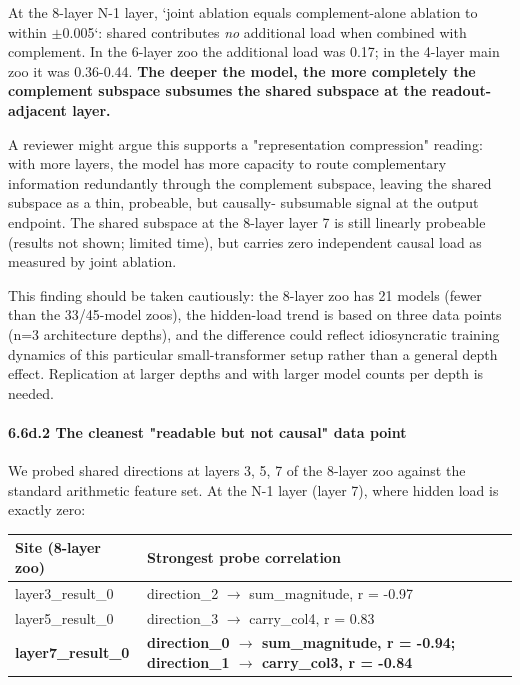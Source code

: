 At the 8-layer N-1 layer, `joint ablation equals complement-alone
ablation to within $\pm$0.005`: shared contributes \emph{no} additional load
when combined with complement. In the 6-layer zoo the additional load
was 0.17; in the 4-layer main zoo it was 0.36-0.44. \textbf{The deeper the model, the more completely the complement subspace subsumes the shared subspace at the readout-adjacent layer.}

A reviewer might argue this supports a "representation compression"
reading: with more layers, the model has more capacity to route
complementary information redundantly through the complement subspace,
leaving the shared subspace as a thin, probeable, but causally-
subsumable signal at the output endpoint. The shared subspace at the
8-layer layer 7 is still linearly probeable (results not shown; limited
time), but carries zero independent causal load as measured by joint
ablation.

This finding should be taken cautiously: the 8-layer zoo has 21 models
(fewer than the 33/45-model zoos), the hidden-load trend is based on
three data points (n=3 architecture depths), and the difference could
reflect idiosyncratic training dynamics of this particular
small-transformer setup rather than a general depth effect. Replication
at larger depths and with larger model counts per depth is needed.

\paragraph{6.6d.2 The cleanest "readable but not causal" data point}

We probed shared directions at layers 3, 5, 7 of the 8-layer zoo
against the standard arithmetic feature set. At the N-1 layer (layer 7),
where hidden load is exactly zero:

\begin{center}
\begin{tabular}{|l|l|}
\hline
\textbf{Site (8-layer zoo)} & \textbf{Strongest probe correlation} \\
\hline
layer3\_result\_0 & direction\_2 $\to$ sum\_magnitude, r = -0.97 \\
layer5\_result\_0 & direction\_3 $\to$ carry\_col4, r = 0.83 \\
\textbf{layer7\_result\_0} & \textbf{direction\_0 $\to$ sum\_magnitude, r = -0.94; direction\_1 $\to$ carry\_col3, r = -0.84} \\
\hline
\end{tabular}
\end{center}



